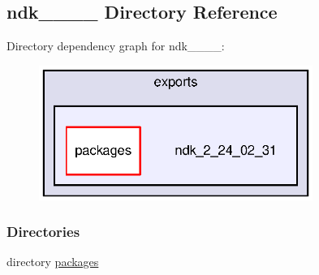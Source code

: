 \subsection{ndk\+\_\+\_\+\_\+\_ Directory Reference}
\label{dir_1021f93d0b96307b7d5f62de93307e11}
Directory dependency graph for ndk\+\_\+\_\+\_\+\_\+:
\nopagebreak
\begin{figure}[H]
\begin{center}
\leavevmode
\includegraphics[width=253pt]{dir_1021f93d0b96307b7d5f62de93307e11_dep}
\end{center}
\end{figure}
\subsubsection*{Directories}
\begin{DoxyCompactItemize}
\item 
directory \hyperlink{dir_16c225f92d85c2647011474909c4aadf}{packages}
\end{DoxyCompactItemize}
